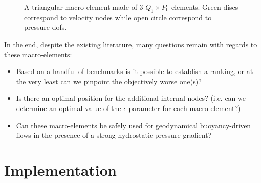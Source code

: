 \documentclass[a4paper]{article}
\begin{document}
\begin{figure}
\centering
{}
\caption{A triangular macro-element made of 3 $Q_1\times P_0$ elements.
Green discs correspond to velocity nodes while open circle correspond to pressure dofs.}\label{fig:triangle}
\end{figure}

\vspace{.4cm}


In the end, despite the existing literature, many questions remain with regards to these macro-elements:
\begin{itemize}
\item Based on a handful of benchmarks is it possible to establish a ranking, or at the very least can we pinpoint the objectively worse one(s)?

\item Is there an optimal position for the additional internal nodes? (i.e. can we determine an optimal value of the 
$\epsilon$ parameter for each macro-element?)

\item Can these macro-elements be safely used for geodynamical 
buoyancy-driven flows in the presence of a strong hydrostatic pressure gradient?
\end{itemize}











\section{Implementation}
\end{document}
